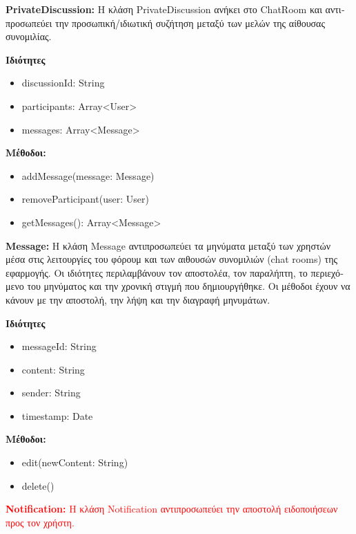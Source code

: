 \documentclass{article}
\begin{document}
\textbf{PrivateDiscussion:} \textgreek{Η κλάση} PrivateDiscussion \textgreek{ανήκει στο} ChatRoom \textgreek{και αντιπροσωπεύει την προσωπική/ιδιωτική συζήτηση μεταξύ των μελών της αίθουσας συνομιλίας.}
\newline
\newline

\textbf{\textgreek{Ιδιότητες}}
\begin{itemize}
    \item discussionId: String
    \item participants: Array<User>
    \item messages: Array<Message>
\end{itemize}
\textbf{\textgreek{Μέθοδοι:}}
\begin{itemize}
    \item addMessage(message: Message)
    \item removeParticipant(user: User)
    \item getMessages(): Array<Message>
\end{itemize}

\textbf{Message:} \textgreek{Η κλάση} Message \textgreek{αντιπροσωπεύει τα μηνύματα μεταξύ των χρηστών μέσα στις λειτουργίες του φόρουμ και των αιθουσών συνομιλιών} (chat rooms) \textgreek{της εφαρμογής. Οι ιδιότητες περιλαμβάνουν τον αποστολέα, τον παραλήπτη, το περιεχόμενο του μηνύματος και την χρονική στιγμή που δημιουργήθηκε. Οι μέθοδοι έχουν να κάνουν με την αποστολή, την λήψη και την διαγραφή μηνυμάτων.}
\newline
\newline

\textbf{\textgreek{Ιδιότητες}}
\begin{itemize}
    \item messageId: String
    \item content: String
    \item sender: String
    \item timestamp: Date
\end{itemize}
\textbf{\textgreek{Μέθοδοι:}}
\begin{itemize}
    \item edit(newContent: String)
    \item delete()
\end{itemize}

\textcolor{red}{\textbf{Notification:} \textgreek{Η κλάση} Notification \textgreek{αντιπροσωπεύει την αποστολή ειδοποιήσεων προς τον χρήστη.}}
\newline
\newline
\end{document}
